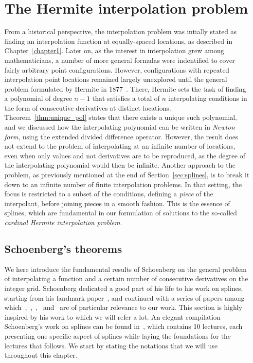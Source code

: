 \chapter{The Hermite interpolation problem}\label{chapter2}

From a historical perspective, the interpolation problem was intially stated as finding an interpolation function at 
equally-spaced locations, as described in Chapter~\ref{chapter1}. Later on, as the interest in interpolation grew among 
mathematicians, a number of more general formulas were indentified to cover fairly arbitrary point configurations.  
However, configurations with repeated interpolation point locations remained largely unexplored until the general 
problem formulated by Hermite in 1877~\cite{hermite_1877}. There, Hermite sets the task of finding a polynomial of 
degree $n-1$ that satisfies a total of $n$ interpolating conditions in the form of consecutive derivatives at distinct 
locations.  Theorem~\ref{thm:unique_pol} states that there exists a unique such polynomial, and we discussed how the 
interpolating polynomial can be written in \emph{Newton form}, using the extended divided difference operator. However,
the result does not extend to the problem of interpolating at an infinite number of locations, even when only values and 
not derivatives are to be reproduced, as the degree of the interpolating polynomial would then be infinite. Another 
approach to the problem, as previously mentioned at the end of Section~\ref{sec:splines}, is to break it down to an 
infinite number of finite interpolation problems. In that setting, the focus is restricted to a subset of the 
conditions, defining a \emph{piece} of the interpolant, before joining pieces in a smooth fashion.  This is the essence 
of splines, which are fundamental in our formulation of solutions to the so-called \emph{cardinal Hermite interpolation 
problem}.

\section{Schoenberg's theorems}

We here introduce the fundamental results of Schoenberg on the general problem of interpolating a function and a certain 
number of consecutive derivatives on the integer grid. Schoenberg dedicated a good part of his life to his work on 
splines, starting from his landmark paper~\cite{schoenberg_contributions_1946}, and continued with a series of papers 
among 
which~\cite{schoenberg_cardinal_1969},~\cite{schoenberg_cardinal_1972a},~\cite{schoenberg_cardinal_1972b},~\cite{lipow_cardinal_1973} 
and~\cite{schoenberg_cardinal_1973} are of particular relevance to our work. This section is highly inspired by his work 
to which we will refer a lot.  An elegant compilation Schoenberg's work on splines can be found 
in~\cite{schoenberg_cardinal_1973:1}, which contains 10 lectures, each presenting one specific aspect of splines while 
laying the foundations for the lectures that follows. We start by stating the notations that we will use throughout this 
chapter.

